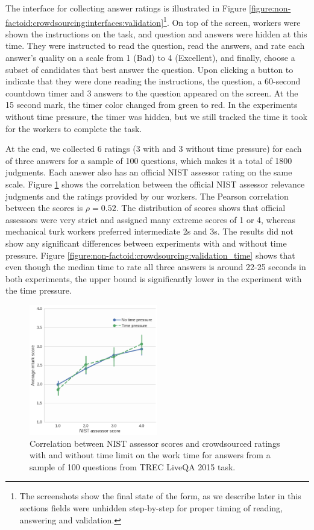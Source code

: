 The interface for collecting answer ratings is illustrated in Figure \ref{figure:non-factoid:crowdsourcing:interfaces:validation}\footnote{The screenshots show the final state of the form, as we describe later in this sections fields were unhidden step-by-step for proper timing of reading, answering and validation.}.
On top of the screen, workers were shown the instructions on the task, and question and answers were hidden at this time.
They were instructed to read the question, read the answers, and rate each answer's quality on a scale from 1 (Bad) to 4 (Excellent), and finally, choose a subset of candidates that best answer the question.
Upon clicking a button to indicate that they were done reading the instructions, the question, a 60-second countdown timer and 3 answers to the question appeared on the screen.
At the 15 second mark, the timer color changed from green to red.
In the experiments without time pressure, the timer was hidden, but we still tracked the time it took for the workers to complete the task.

At the end, we collected 6 ratings (3 with and 3 without time pressure) for each of three answers for a sample of 100 questions, which makes it a total of 1800 judgments.
Each answer also has an official NIST assessor rating on the same scale.
Figure \ref{figure:non-factoid:crowdsourcing:score_correlation} shows the correlation between the official NIST assessor relevance judgments and the ratings provided by our workers.
The Pearson correlation between the scores is $\rho=0.52$.
The distribution of scores shows that official assessors were very strict and assigned many extreme scores of 1 or 4, whereas mechanical turk workers preferred intermediate 2s and 3s.
The results did not show any significant differences between experiments with and without time pressure.
Figure \ref{figure:non-factoid:crowdsourcing:validation_time} shows that even though the median time to rate all three answers is around 22-25 seconds in both experiments, the upper bound is significantly lower in the experiment with the time pressure.

\begin{figure}
    \centering
    \includegraphics[width=0.5\textwidth]{img/score_correlation}
    \caption{Correlation between NIST assessor scores and crowdsourced ratings with and without time limit on the work time for answers from a sample of 100 questions from TREC LiveQA 2015 task.}
    \label{figure:non-factoid:crowdsourcing:score_correlation}
\end{figure}

